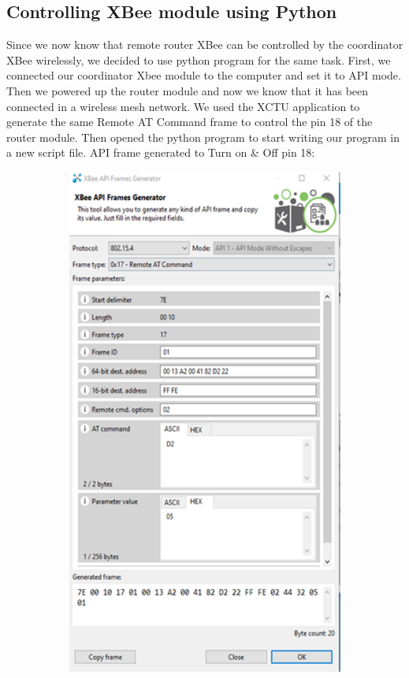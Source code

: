 \documentclass[letter,twocolumn]{report}
\begin{document}
	
	\subsection{Controlling XBee module using Python}
	\par Since we now know that remote router XBee can be controlled by the coordinator XBee wirelessly, we decided to use python program for the same task. First, we connected our coordinator Xbee module to the computer and set it to API mode. Then we powered up the router module and now we know that it has been connected in a wireless mesh network. We used the XCTU application to generate the same Remote AT Command frame to control the pin 18 of the router module. Then opened the python program to start writing our program in a new script file. API frame generated to Turn on \& Off pin 18: 
	\begin{figure}[h!]
		\centering
		\begin{subfigure}[t]{0.22\textwidth}
			\centering
			\includegraphics[width=\textwidth]{xctuFrames1.png}

\end{subfigure}
\end{figure}
\end{document}
